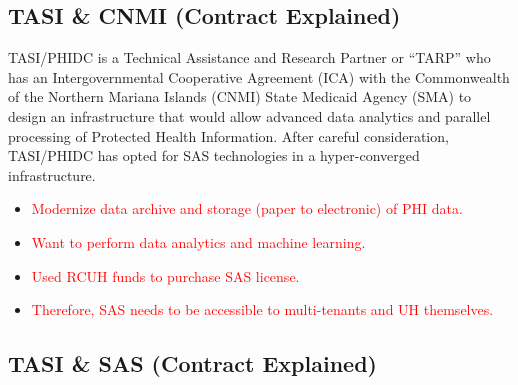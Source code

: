 \subsection{TASI \& CNMI (Contract Explained)}
TASI/PHIDC is a Technical Assistance and Research Partner or “TARP” who has an Intergovernmental Cooperative Agreement (ICA) with the Commonwealth of the Northern Mariana Islands (CNMI) State Medicaid Agency (SMA) to design an infrastructure that would allow advanced data analytics and parallel processing of Protected Health Information. After careful consideration, TASI/PHIDC has opted for SAS technologies in a hyper-converged infrastructure.

\begin{itemize}
    \item \textcolor{red}{Modernize data archive and storage (paper to electronic) of PHI data.}
    \item \textcolor{red}{Want to perform data analytics and machine learning.}
    \item \textcolor{red}{Used RCUH funds to purchase SAS license.}
    \item \textcolor{red}{Therefore, SAS needs to be accessible to multi-tenants and UH themselves.}
\end{itemize}

\subsection{TASI \& SAS (Contract Explained)}

